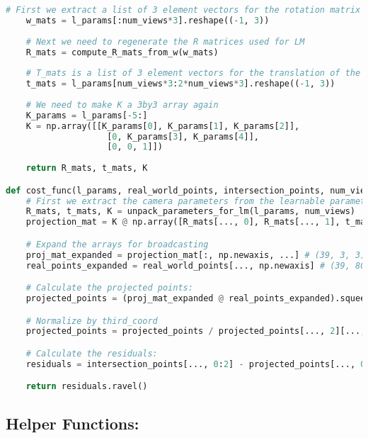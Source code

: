 \documentclass{article}
\begin{document}
\begin{lstlisting}[language=Python]
    # First we extract a list of 3 element vectors for the rotation matrix from w
    w_mats = l_params[:num_views*3].reshape((-1, 3))
    
    # Next we need to regenerate the R matrices used for LM
    R_mats = compute_R_mats_from_w(w_mats)
    
    # T_mats is a list of 3 element vectors for the translation of the camera
    t_mats = l_params[num_views*3:2*num_views*3].reshape((-1, 3))
    
    # We need to make K a 3by3 array again
    K_params = l_params[-5:]
    K = np.array([[K_params[0], K_params[1], K_params[2]], 
                    [0, K_params[3], K_params[4]],
                    [0, 0, 1]])
    
    return R_mats, t_mats, K

def cost_func(l_params, real_world_points, intersection_points, num_views):
    # First we extract the camera parameters from the learnable parameter array
    R_mats, t_mats, K = unpack_parameters_for_lm(l_params, num_views)
    projection_mat = K @ np.array([R_mats[..., 0], R_mats[..., 1], t_mats]).transpose(1, 0, 2)

    # Expand the arrays for broadcasting
    proj_mat_expanded = projection_mat[:, np.newaxis, ...] # (39, 3, 3) to (39, 1, 3, 3)
    real_points_expanded = real_world_points[..., np.newaxis] # (39, 80, 3) to (39, 80, 3, 1)

    # Calculate the projected points:
    projected_points = (proj_mat_expanded @ real_points_expanded).squeeze(-1)

    # Normalize by third_coord
    projected_points = projected_points / projected_points[..., 2][..., np.newaxis]

    # Calculate the residuals:
    residuals = intersection_points[..., 0:2] - projected_points[..., 0:2]

    return residuals.ravel()
\end{lstlisting}

\subsection{Helper Functions:}
\end{document}
